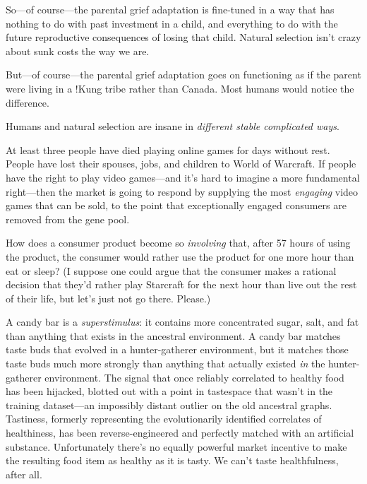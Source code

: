 {
 So---of course---the parental grief adaptation is fine-tuned in a
way that has nothing to do with past investment in a child, and
everything to do with the future reproductive consequences of losing
that child. Natural selection isn't crazy about sunk
costs the way we are.}

{
 But---of course---the parental grief adaptation goes on
functioning as if the parent were living in a !Kung tribe rather than
Canada. Most humans would notice the difference.}

{
 Humans and natural selection are insane in \textit{different
stable complicated ways}.}

\myendsectiontext


\bigskip


{
 At least three people have died playing online games for days
without rest. People have lost their spouses, jobs, and children to
World of Warcraft. If people have the right to play video games---and
it's hard to imagine a more fundamental right---then
the market is going to respond by supplying the most \textit{engaging}
video games that can be sold, to the point that exceptionally engaged
consumers are removed from the gene pool. }

{
 How does a consumer product become so \textit{involving} that,
after 57 hours of using the product, the consumer would rather use the
product for one more hour than eat or sleep? (I suppose one could argue
that the consumer makes a rational decision that they'd
rather play Starcraft for the next hour than live out the rest of their
life, but let's just not go there. Please.)}

{
 A candy bar is a \textit{superstimulus}: it contains more
concentrated sugar, salt, and fat than anything that exists in the
ancestral environment. A candy bar matches taste buds that evolved in a
hunter-gatherer environment, but it matches those taste buds much more
strongly than anything that actually existed \textit{in} the
hunter-gatherer environment. The signal that once reliably correlated
to healthy food has been hijacked, blotted out with a point in
tastespace that wasn't in the training dataset---an
impossibly distant outlier on the old ancestral graphs. Tastiness,
formerly representing the evolutionarily identified correlates of
healthiness, has been reverse-engineered and perfectly matched with an
artificial substance. Unfortunately there's no equally
powerful market incentive to make the resulting food item as healthy as
it is tasty. We can't taste healthfulness, after all.}

